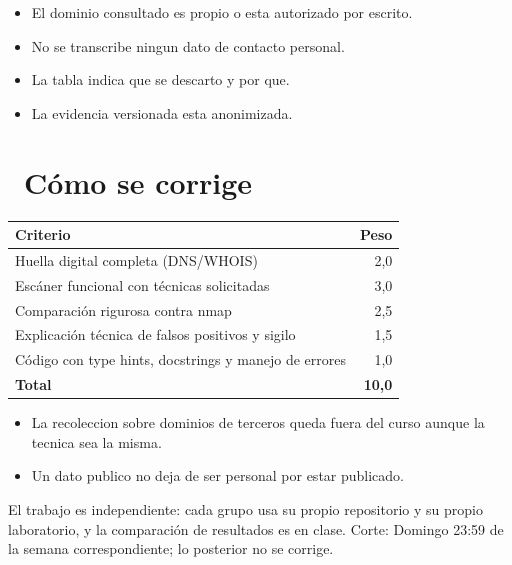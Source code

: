 \documentclass[11pt,a4paper]{article}
\newcommand{\iconotexto}[2]{\textcolor{cyanNeon}{\faIcon{#1}}~#2}
\begin{document}
\begin{itemize}[leftmargin=1.4em,itemsep=2pt,topsep=3pt]
  \item El dominio consultado es propio o esta autorizado por escrito.
  \item No se transcribe ningun dato de contacto personal.
  \item La tabla indica que se descarto y por que.
  \item La evidencia versionada esta anonimizada.
\end{itemize}

\section{\iconotexto{ruler-combined}{Cómo se corrige}}

\begin{tabularx}{\linewidth}{@{}X r@{}}
\toprule
Criterio & Peso\\
\midrule
Huella digital completa (DNS/WHOIS) & 2,0 \\
Escáner funcional con técnicas solicitadas & 3,0 \\
Comparación rigurosa contra nmap & 2,5 \\
Explicación técnica de falsos positivos y sigilo & 1,5 \\
Código con type hints, docstrings y manejo de errores & 1,0 \\
\midrule
\textbf{Total} & \textbf{10,0}\\
\bottomrule
\end{tabularx}

\begin{itemize}[leftmargin=1.4em,itemsep=2pt,topsep=3pt]
  \item La recoleccion sobre dominios de terceros queda fuera del curso aunque la tecnica sea la misma.
  \item Un dato publico no deja de ser personal por estar publicado.
\end{itemize}

\begin{cajaRecuerda}El trabajo es independiente: cada grupo usa su propio repositorio y su propio laboratorio, y la comparación de resultados es en clase. Corte: Domingo 23:59 de la semana correspondiente; lo posterior no se corrige.
\end{cajaRecuerda}
\end{document}
